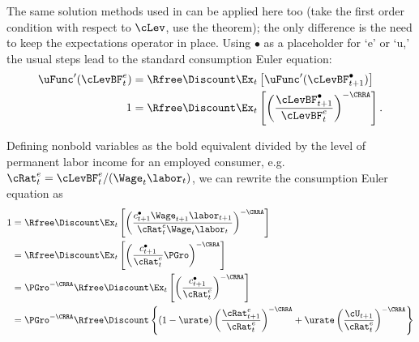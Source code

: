 \documentclass{\handout}
\begin{document}
The same solution methods used in  can 
be applied here too (take the first order condition with respect to $\cLev$, use
the  theorem); the only difference is the need to keep the expectations operator
in place.  Using $\bullet$ as a placeholder for `e' or `u,' the
usual steps lead to the standard consumption Euler equation:
\begin{equation}\begin{gathered}\begin{aligned}
        \uFunc^{\prime}(\cLevBF^{e}_{t}) & =  \Rfree\Discount \Ex_{t}\left[\uFunc^{\prime}(\cLevBF^{\bullet}_{t+1}) \right]
\\  1         & =  \Rfree\Discount \Ex_{t}\left[\left(\frac{\cLevBF^{\bullet}_{t+1}}{\cLevBF^{e}_{t}}\right)^{-\CRRA} \right]
.
\end{aligned}\end{gathered}\end{equation}

Defining nonbold variables as the bold equivalent divided
by the level of permanent labor income for an employed consumer, e.g.\ ${\cRat}^{e}_{t}=\cLevBF^{e}_{t}/(\Wage_{t}\labor_{t})$, we can rewrite the
consumption Euler equation as
\begin{equation}\label{eq:Explicit}\begin{split}
  1         & =  \Rfree\Discount \Ex_{t}\left[\left(\frac{{c}^{\bullet}_{t+1} \Wage_{t+1}\labor_{t+1}}{{\cRat}^{e}_{t} \Wage_{t}\labor_{t}}\right)^{-\CRRA} \right]  
\\          & =  \Rfree\Discount \Ex_{t}\left[\left(\frac{{c}^{\bullet}_{t+1}}{{\cRat}^{e}_{t}}\PGro\right)^{-\CRRA} \right]
\\          & =  \PGro^{-\CRRA}\Rfree\Discount \Ex_{t}\left[\left(\frac{{c}^{\bullet}_{t+1}}{{\cRat}^{e}_{t}}\right)^{-\CRRA} \right] 
\\          & =  \PGro^{-\CRRA}\Rfree\Discount \left\{(1-\urate)\left(\frac{{\cRat}^{e}_{t+1}}{{\cRat}^{e}_{t}}\right)^{-\CRRA}+\urate \left(\frac{\cU_{t+1}}{{\cRat}^{e}_{t}}\right)^{-\CRRA}\right\} 
\end{split}\end{equation}
\end{document}
